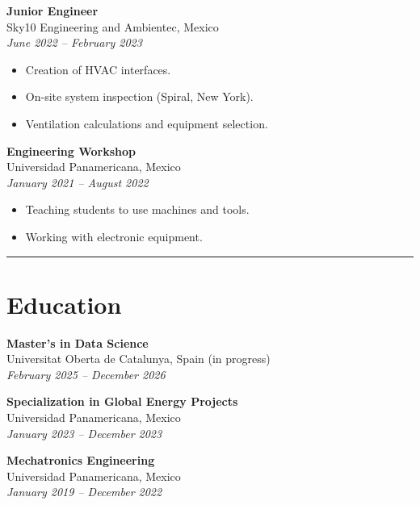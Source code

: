 \documentclass[11pt,a4paper]{article}
\begin{document}
\begin{minipage}[t]{0.65\textwidth}
\vspace{1em}

\textbf{Junior Engineer} \\
Sky10 Engineering and Ambientec, Mexico \\
\textit{June 2022 -- February 2023}
\begin{itemize}
    \item Creation of HVAC interfaces.
    \item On-site system inspection (Spiral, New York).
    \item Ventilation calculations and equipment selection.
\end{itemize}

\vspace{1em}

\textbf{Engineering Workshop} \\
Universidad Panamericana, Mexico \\
\textit{January 2021 -- August 2022}
\begin{itemize}
    \item Teaching students to use machines and tools.
    \item Working with electronic equipment.
\end{itemize}

\vspace*{2em}
{\color{lightgray}\hrule}

\section*{Education}
\footnotesize

\textbf{Master's in Data Science} \\
Universitat Oberta de Catalunya, Spain (in progress) \\
\textit{February 2025 -- December 2026}

\vspace{1em}

\textbf{Specialization in Global Energy Projects} \\
Universidad Panamericana, Mexico \\
\textit{January 2023 -- December 2023}

\vspace{1em}

\textbf{Mechatronics Engineering} \\
Universidad Panamericana, Mexico \\
\textit{January 2019 -- December 2022}


\end{minipage}
\end{document}
